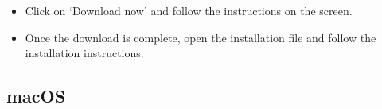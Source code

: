 \begin{itemize}
\begin{itemize}
	\end{itemize}
		\item Click on ‘Download now’ and follow the instructions on the screen.
	\item Once the download is complete, open the installation file and follow the installation instructions.
\end{itemize}
\subsection*{macOS}
